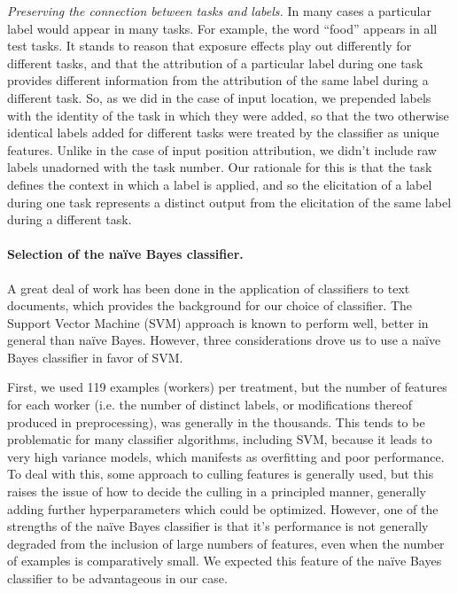 \documentclass[12pt]{article}
\begin{document}
	\textit{Preserving the connection between tasks and labels.}  In many
	cases a particular label would appear in many tasks.  For example, the
	word ``food'' appears in all test tasks.  It stands to reason that
	exposure effects play out differently for different tasks, and that
	the attribution of a particular label during one task provides different
	information from the attribution of the same label during a different 
	task.  So, as we did in the case of input location, we prepended labels
	with the identity of the task in which they were added, so that the 
	two otherwise identical labels added for different tasks were treated
	by the classifier as unique features.  Unlike in the case of input 
	position attribution, we didn't include raw labels unadorned with 
	the task number.  Our rationale for this is that the task defines the 
	context in which a label is applied, and so the elicitation of a label 
	during one task represents a distinct output from the elicitation of the 
	same label during a different task.  

\paragraph{Selection of the na\"ive Bayes classifier.}
A great deal of work has been done in the application of classifiers to
text documents, which provides the background for our choice of classifier.
The Support Vector Machine (SVM) approach is known to perform well, better in 
general than na\"ive Bayes.  However, three considerations drove us to use
a na\"ive Bayes classifier in favor of SVM.

First, we used 119 examples (workers) per treatment, but the number of 
features
for each worker (i.e. the number of distinct labels, or modifications 
thereof produced in preprocessing), was generally in the thousands.  
This tends to
be problematic for many classifier algorithms, including SVM, because it
leads to very high variance models, which manifests as overfitting and poor
performance.  To deal with this, some approach to culling features is 
generally used, but this raises the issue of how to decide the culling in 
a principled manner, generally adding further hyperparameters which could
be optimized.  However, one of the strengths of the na\"ive Bayes classifier
is that it's performance is not generally degraded from the inclusion of 
large numbers of features, even when the number of examples is comparatively
small.  We expected this feature of the na\"ive Bayes classifier to be 
advantageous in our case.
\end{document}
